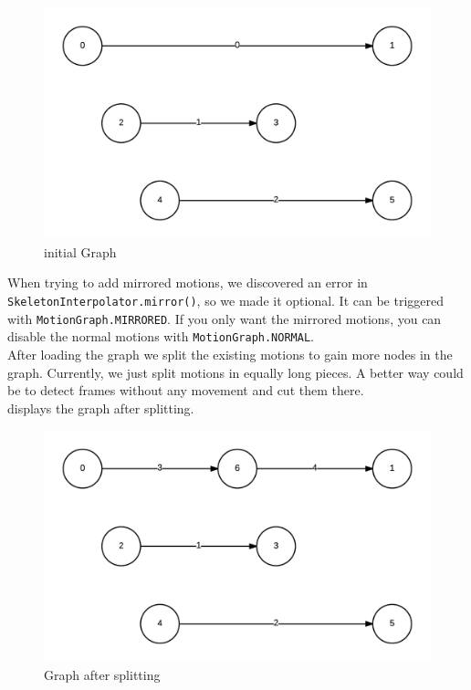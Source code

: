 \documentclass[a4paper,10pt,titlepage,bibliography=totocnumbered]{scrartcl}
\begin{document}
\begin{figure}[ht]
\centering
\includegraphics[width=\textwidth/2]{img/1_GraphAtStart.png}
\caption{initial Graph}
\label{fig:at_start}
\end{figure}

When trying to add mirrored motions, we discovered an error in \lstinline{SkeletonInterpolator.mirror()}, so we made it optional. It can be triggered with \lstinline{MotionGraph.MIRRORED}. If you only want the mirrored motions, you can disable the normal motions with \lstinline{MotionGraph.NORMAL}.\\


After loading the graph we split the existing motions to gain more nodes in the graph. Currently, we just split motions in equally long pieces. A better way could be to detect frames without any movement and cut them there.
\\
 displays the graph after splitting.

\begin{figure}[ht]
\centering
\includegraphics[width=\textwidth/2]{img/2_GraphAfterSplit.png}
\caption{Graph after splitting}
\label{fig:after_split}
\end{figure}
\end{document}
